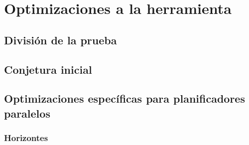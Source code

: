 
\chapter{Optimizaciones a la herramienta}
\label{Chapter3}

\section{División de la prueba}
\section{Conjetura inicial}
\section{Optimizaciones específicas para planificadores paralelos}
\subsection{Horizontes}
